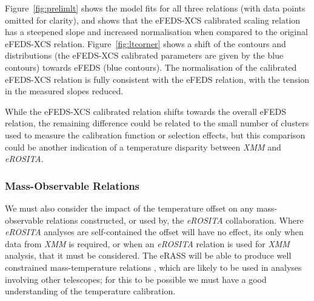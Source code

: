 \documentclass[fleqn,usenatbib]{mnras}
\begin{document}
Figure~\ref{fig:prelimlt} shows the model fits for all three relations (with data points omitted for clarity), and shows that the eFEDS-XCS calibrated scaling relation has a steepened slope and increased normalisation when compared to the original eFEDS-XCS relation.  Figure~\ref{fig:ltcorner} shows a shift of the contours and distributions (the eFEDS-XCS calibrated parameters are given by the blue contours) towards eFEDS (blue contours).  The normalisation of the calibrated eFEDS-XCS relation is fully consistent with the eFEDS relation, with the tension in the measured slopes reduced.  

While the eFEDS-XCS calibrated relation shifts towards the overall eFEDS relation, the remaining difference could be related to the small number of clusters used to measure the calibration function or selection effects, but this comparison could be another indication of a temperature disparity between {\em XMM} and {\em eROSITA}.


\subsubsection{Mass-Observable Relations}
We must also consider the impact of the temperature offset on any mass-observable relations constructed, or used by, the {\em eROSITA} collaboration. Where {\em eROSITA} analyses are self-contained the offset will have no effect, its only when data from {\em XMM} is required, or when an {\em eROSITA} relation is used for {\em XMM} analysis, that it must be considered. The eRASS will be able to produce well constrained mass-temperature relations \citep[e.g.,][using eFEDS data]{efedsmor}, which are likely to be used in analyses involving other telescopes; for this to be possible we must have a good understanding of the temperature calibration.
\end{document}
